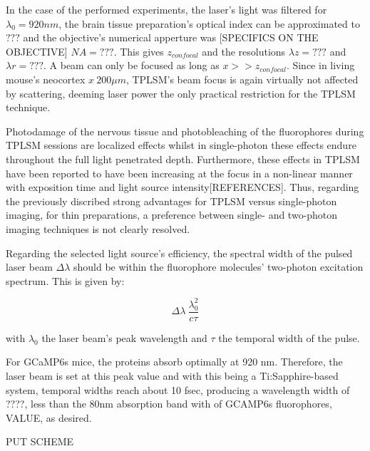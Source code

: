 In the case of the performed experiments, the laser's light was filtered for $\lambda _0 = 920 nm$, the brain tissue preparation's optical index can be approximated to $???$ and the objective's numerical apperture was [SPECIFICS ON THE OBJECTIVE] $NA=???$. This gives $z_{confocal}$ and the resolutions $ \lambda z = ???$ and $\lambda r = ???$. 
A beam can only be focused as long as $x >> z_{confocal}$. Since in living mouse's neocortex $x ~ 200 \mu m$, TPLSM's beam focus is again virtually not affected by scattering, deeming laser power the only practical restriction for the TPLSM technique.

Photodamage of the nervous tissue and photobleaching of the fluorophores during TPLSM sessions are localized effects whilst in single-photon these effects endure throughout the full light penetrated depth. Furthermore, these effects in TPLSM have been reported to have been increasing at the focus in a non-linear manner with exposition time and light source intensity[REFERENCES]. Thus, regarding the previously discribed strong advantages for TPLSM versus single-photon imaging, for thin preparations, a preference between single- and two-photon imaging techniques is not clearly resolved.

Regarding the selected light source's efficiency, the spectral width of the pulsed laser beam $\Delta \lambda$ should be within the fluorophore molecules' two-photon excitation spectrum. This is given by:

\begin{equation}
\Delta \lambda ~ \dfrac{\lambda_0 ^2}{c \tau}
\end{equation} 

with $\lambda_0$ the laser beam's peak wavelength and $\tau$ the temporal width of the pulse. 

For GCaMP6s mice, the proteins absorb optimally at 920 nm. Therefore, the laser beam is set at this peak value and with this being a Ti:Sapphire-based system, temporal widths reach about 10 fsec, producing a wavelength width of  ????, less than the 80nm absorption band with of GCAMP6s fluorophores, VALUE, as desired.

PUT SCHEME

